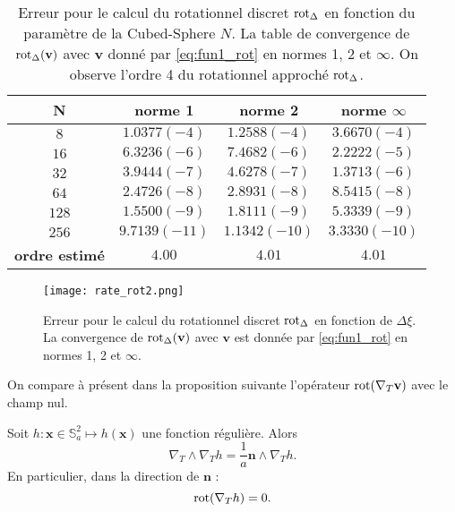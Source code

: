 \begin{table}[htbp]
\begin{center}
\begin{tabular}{|c||c|c|c|}
\hline
\textbf{N}  & \textbf{norme 1} & \textbf{norme 2} & \textbf{norme $\infty$} \\
\hline
\hline
$8$  & $1.0377(-4)$  & $1.2588(-4)$  & $3.6670(-4)$  \\
$16$ & $6.3236(-6)$  & $7.4682(-6)$  & $2.2222(-5)$  \\
$32$ & $3.9444(-7)$  & $4.6278(-7)$  & $1.3713(-6)$  \\
$64$ & $2.4726(-8)$  & $2.8931(-8)$  & $8.5415(-8)$  \\
$128$& $1.5500(-9)$  & $1.8111(-9)$  & $5.3339(-9)$  \\
$256$& $9.7139(-11)$ & $1.1342(-10)$ & $3.3330(-10)$ \\
\hline 
\hline
\textbf{ordre estimé}& $4.00$ & $4.01$ & $4.01$\\
\hline
\end{tabular}
\end{center}
\caption{Erreur pour le calcul du rotationnel discret $\text{rot}_{\Delta}$ en fonction du paramètre de la Cubed-Sphere $N$. La table de convergence de $\text{rot}_{\Delta} ( \mathbf{v} )$ avec $\mathbf{v}$ donné par \eqref{eq:fun1_rot} en normes 1, 2 et $\infty$. On observe l'ordre 4 du rotationnel approché $\text{rot}_{\Delta}$.}
\label{tab:rate_rot2}
\end{table} 

\begin{figure}[htbp]
\begin{center}
\texttt{[image: rate\_rot2.png]}
\end{center}
\caption{Erreur pour le calcul du rotationnel discret $\text{rot}_{\Delta}$ en fonction de $\Delta \xi$. La convergence de $\text{rot}_{\Delta} ( \mathbf{v} )$ avec $\mathbf{v}$ est donnée par \eqref{eq:fun1_rot} en normes 1, 2 et $\infty$.}
\label{fig:rate_rot2}
\end{figure}

On compare à présent dans la proposition suivante l'opérateur $\text{rot}(\nabla_T \mathbf{v})$ avec le champ nul.

\begin{proposition}
Soit $h : \mathbf{x} \in \mathbb{S}_a^2 \mapsto h(\mathbf{x})$ une fonction régulière. Alors 
\begin{equation}
\nabla_T \wedge \nabla_T h = \dfrac{1}{a} \mathbf{n} \wedge \nabla_T h.
\end{equation}
En particulier, dans la direction de $\mathbf{n}$ :
\begin{equation}
\text{rot}(\nabla_T h) = 0.
\end{equation}
\label{prop:vort_grad}
\end{proposition}

